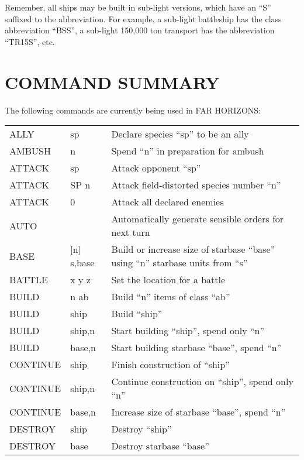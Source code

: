 \documentclass[10pt,titlepage]{article}
\begin{document}
Remember, all ships may be built in sub-light versions, which have an ``S''
suffixed to the abbreviation.  For example, a sub-light battleship has the
class abbreviation ``BSS'', a sub-light 150,000 ton transport has the
abbreviation ``TR15S'', etc.

\section{COMMAND SUMMARY}

The following commands are currently being used in FAR HORIZONS:
\begin{longtable}{llp{9cm}}
ALLY           & sp          &    Declare species ``sp'' to be an ally \\
AMBUSH       &   n           &    Spend ``n'' in preparation for ambush \\
ATTACK       &   sp          &    Attack opponent ``sp'' \\
ATTACK       &   SP n        &    Attack field-distorted species number ``n'' \\
ATTACK       &   0           &    Attack all declared enemies \\
AUTO         &               &    Automatically generate sensible orders for  next turn \\
BASE        &    [n] s,base &     Build or increase size of starbase ``base'' using ``n'' starbase units from ``s''  \\
BATTLE      &    x y z     &      Set the location for a battle  \\
BUILD       &    n ab      &      Build ``n'' items of class ``ab''  \\
BUILD       &    ship      &      Build ``ship''  \\
BUILD       &    ship,n    &      Start building ``ship'', spend only ``n'' \\
BUILD       &    base,n    &      Start building starbase ``base'', spend ``n''  \\
CONTINUE    &    ship      &      Finish construction of ``ship''  \\
CONTINUE    &    ship,n    &      Continue construction on ``ship'', spend only ``n''  \\
CONTINUE    &    base,n    &      Increase size of starbase ``base'', spend ``n''  \\
DESTROY     &    ship      &      Destroy ``ship''  \\
DESTROY     &    base      &      Destroy starbase ``base''  \\

\end{longtable}
\end{document}
